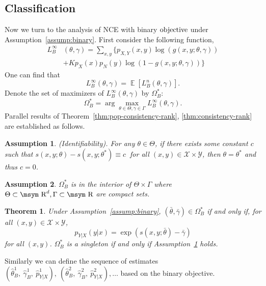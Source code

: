 \documentclass[11pt,a4paper]{article}
\newcommand{\reals}{\mbox{\msym R}}
\DeclareMathOperator{\E}{\mathbb{E}}
\newcommand{\wh}[1]{\widehat{#1}}
\newcommand{\str}[3]{s(#1, #2; #3)}
\newtheorem{theorem}{Theorem}[section]
\newtheorem{assumption}{Assumption}[section]
\newcommand{\loss}{\hbox{objective}}
\begin{document}
\subsection{Classification}
\label{sec:binary}
Now we turn to the analysis of NCE with binary $\loss$ under Assumption~\ref{assump:binary}. First consider the following function, 
\begin{equation*}
\begin{aligned}
L_B^\infty & \left(\theta, \gamma \right) = \sum_{x, y} \Big\{ p_{X, Y}(x, y)\log\left( g(x, y; \theta, \gamma) \right) \\
&  + K p_X(x)p_N(y) \log\left( 1 - g(x, y; \theta, \gamma) \right) \Big\}
\label{eq:binary-inf}
\end{aligned}
\end{equation*}
One can find that 
 \[
 L_B^\infty(\theta, \gamma) = \E \left[ L_B^n(\theta,
  \gamma)\right].
  \]
Denote the set of maximizers of
$L^\infty_B(\theta, \gamma)$ by $\Omega_B^*:$
\[ 
\Omega_B^* = \arg\max_{\theta\in\Theta,
  \gamma\in\Gamma} L_B^\infty\left(\theta, \gamma\right).
  \]
Parallel results of Theorem~\ref{thm:pop-consistency-rank}, \ref{thm:consistency-rank} are established as follows. 
\begin{assumption}
  (Identifiability). For any $\theta\in\Theta$, if there exists some constant
$c$ such that $\str{x}{y}{\theta} - \str{x}{y}{\theta^*} \equiv c~$ for all $ (x, y)\in\mathcal{X} \times \mathcal{Y}$, then $\theta = \theta^*$ and thus $c=0$.
  \label{assump:identifiability-binary}
\end{assumption}

\begin{assumption} 
  $\Omega_B^*$ is in the interior of $\Theta\times\Gamma$ where $\Theta\subset\reals^d, \Gamma\subset\reals$ are compact sets.
    \label{assump:compactness-binary}
\end{assumption}
\begin{theorem}
Under Assumption~\ref{assump:binary}, 
$(\bar{\theta}, \bar{\gamma})\in\Omega_B^*$ if and only if, for all $ (x, y)\in\mathcal{X} \times \mathcal{Y}$,
\[
p_{Y|X}(y|x) = \exp(\str{x}{y}{\bar{\theta}} - \bar{\gamma}) 
\]
for all $(x, y)$. $\Omega_B^*$ is a singleton if and only if
Assumption~\ref{assump:identifiability-binary} holds.
\label{thm:pop-consistency-binary}
\end{theorem}





Similarly we can define the sequence of estimates
$(\wh{\theta}_B^1,~ \wh{\gamma}_B^1, ~\wh{p}^1_{Y|X}), ~(\wh{\theta}_B^2,~
\wh{\gamma}_B^2,~ \wh{p}^2_{Y|X}), \ldots$  based on the binary objective.
\end{document}
